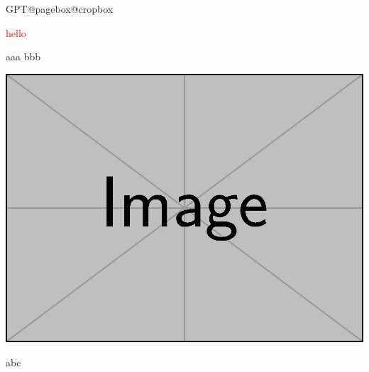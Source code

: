 



\expandafter\ifx\csname GPT@pagebox@cropbox\endcsname\relax\else
{}
\fi

\textcolor{red}{hello}


aaa  bbb

\includegraphics[scale=.5]{example-image}

\scrollmode 
\hbox{}

abc

\bye